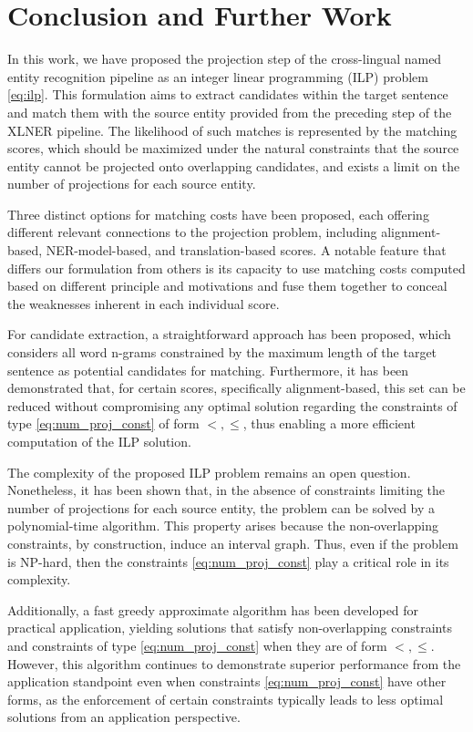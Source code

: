 \chapter{Conclusion and Further Work}
\label{sec:conclusion}

In this work, we have proposed the projection step of the cross-lingual named entity recognition
pipeline as an integer linear programming (ILP) problem \eqref{eq:ilp}.
This formulation aims to extract candidates within the target sentence and match them
with the source entity provided from the preceding step of the XLNER pipeline. The likelihood
of such matches is represented by the matching scores, which should be maximized under
the natural constraints that the source entity cannot be projected onto overlapping candidates,
and exists a limit on the number of projections for each source entity.

Three distinct options for matching costs have been proposed, each offering different relevant
connections to the projection problem, including alignment-based, NER-model-based, and translation-based scores.
A notable feature that differs our formulation from others is its capacity to use matching costs
computed based on different principle and motivations and fuse them together to conceal the weaknesses
inherent in each individual score.

For candidate extraction, a straightforward approach has been proposed, which considers all word
n-grams constrained by the maximum length of the target sentence as potential candidates for matching.
Furthermore, it has been demonstrated that, for certain scores, specifically alignment-based, this
set can be reduced without compromising any optimal solution regarding the constraints of type
\eqref{eq:num_proj_const} of form \( <, \leq \), thus enabling a more efficient computation
of the ILP solution.

The complexity of the proposed ILP problem remains an open question. Nonetheless, it has been
shown that, in the absence of constraints limiting the number of projections for each source
entity, the problem can be solved by a polynomial-time algorithm. This property arises because the
non-overlapping constraints, by construction, induce an interval graph. Thus, even if the problem is NP-hard,
then the constraints \eqref{eq:num_proj_const} play a critical role in its complexity.

Additionally, a fast greedy approximate algorithm has been developed for practical application,
yielding solutions that satisfy non-overlapping constraints and constraints of
type \eqref{eq:num_proj_const} when they are of form \( <, \leq \). However, this algorithm continues
to demonstrate superior performance from the application standpoint even when constraints \eqref{eq:num_proj_const} have other forms, as the
enforcement of certain constraints typically leads to less optimal solutions from an application
perspective.

